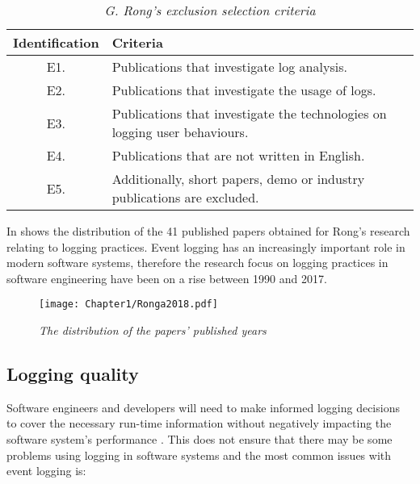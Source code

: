 \begin{table}[!htb]
	\centering
	\small
	\caption[G. Rong's exclusion selection criteria]
	{\textit{G. Rong's exclusion selection criteria \cite{Rong2018a}}}
	\label{tbl:CH1_RongExlSelectionCriteria}
	\begin{tabularx}{\textwidth}{|c|X|}
		\hline \textbf{Identification} & \textbf{Criteria} \\
		\hline E1. & Publications that investigate log analysis. \\
		\hline E2. & Publications that investigate the usage of logs. \\
		\hline E3. & Publications that investigate the technologies on logging user behaviours. \\
		\hline E4. & Publications that are not written in English. \\
		\hline E5. & Additionally, short papers, demo or industry publications are excluded. \\
		\hline
	\end{tabularx}
\end{table}

In  shows the distribution of the 41 published papers obtained for Rong's research relating to logging practices. Event logging has an increasingly important role in modern software systems, therefore the research focus on logging practices in software engineering have been on a rise between 1990 and 2017.

\begin{figure}[!htb] %
	\centering %
	\texttt{[image: Chapter1/Ronga2018.pdf]}
	\caption[The distribution of the papers’ published years]
	{\textit{The distribution of the papers’ published years \cite{Rong2018a}}} \label{fig:PushblisedPapers}
\end{figure} 

\subsection{Logging quality}

Software engineers and developers will need to make informed logging decisions to cover the necessary run-time information without negatively impacting the software system's performance \cite{Zhu2015,Zhu2019,Kherbouche2017}. This does not ensure that there may be some problems using logging in software systems and the most common issues with event logging is:

